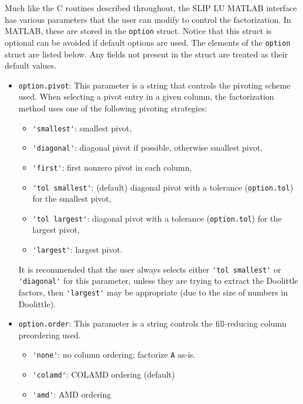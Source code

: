 \documentclass[12pt]{article}
\theoremstyle{definition}
\begin{document}
Much like the C routines described throughout, the SLIP LU MATLAB interface has
various parameters that the user can modify to control the factorization. In
MATLAB, these are stored in the \verb'option' struct.  Notice that this struct
is optional can be avoided if default options are used.  The elements of the
\verb'option' struct are listed below.  Any fields not present in the struct
are treated as their default values.

\begin{itemize}

\item \verb|option.pivot|: This parameter is a string that controls the
pivoting scheme used.  When selecting a pivot entry in a given column, the
factorization method uses one of the following pivoting strategies:

    \begin{itemize}
    \item \verb|'smallest'|: smallest pivot,
    \item \verb|'diagonal'|: diagonal pivot if possible, otherwise smallest pivot,
    \item \verb|'first'|: first nonzero pivot in each column,
    \item \verb|'tol smallest'|: (default) diagonal pivot with a tolerance (\verb|option.tol|)
        for the smallest pivot,
    \item \verb|'tol largest'|: diagonal pivot with a tolerance (\verb|option.tol|)
        for the largest pivot,
    \item \verb|'largest'|: largest pivot.
    \end{itemize}

It is recommended that the user always selects either \verb|'tol smallest'| or
\verb|'diagonal'| for this parameter, unless they are trying to extract the
Doolittle factors, then \verb|'largest'| may be appropriate (due to the size of
numbers in Doolittle).

\item \verb|option.order|: This parameter is a string controls the
fill-reducing column preordering used.

    \begin{itemize}
    \item \verb|'none'|: no column ordering; factorize \verb'A' as-is.
    \item \verb|'colamd'|: COLAMD ordering (default)
    \item \verb|'amd'|: AMD ordering
    \end{itemize}


\end{itemize}
\end{document}
